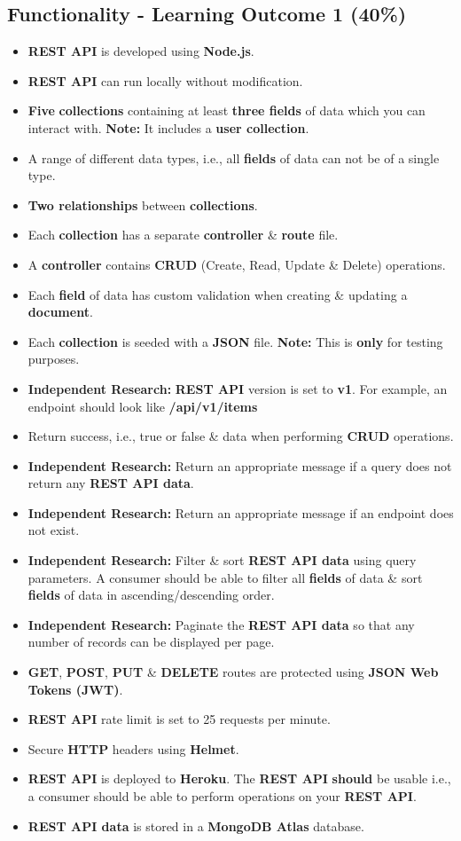 \documentclass{article}
\begin{document}
\subsection*{Functionality - Learning Outcome 1 (40\%)}
\begin{itemize}
	\item \textbf{REST API} is developed using \textbf{Node.js}.
	\item \textbf{REST API} can run locally without modification.
	\item \textbf{Five} \textbf{collections} containing at least \textbf{three fields} of data which you can interact with. \textbf{Note:} It includes a \textbf{user collection}.
	\item A range of different data types, i.e., all \textbf{fields} of data can not be of a single type.
	\item \textbf{Two relationships} between \textbf{collections}.
	\item Each \textbf{collection} has a separate \textbf{controller} \& \textbf{route} file.
	\item A \textbf{controller} contains \textbf{CRUD} (Create, Read, Update \& Delete) operations.
	\item Each \textbf{field} of data has custom validation when creating \& updating a \textbf{document}.
	\item Each \textbf{collection} is seeded with a \textbf{JSON} file. \textbf{Note:} This is \textbf{only} for testing purposes.
	\item \textbf{Independent Research:} \textbf{REST API} version is set to \textbf{v1}. For example, an endpoint should look like \textbf{/api/v1/items}
	\item Return success, i.e., true or false \& data when performing \textbf{CRUD} operations.
	\item \textbf{Independent Research:} Return an appropriate message if a query does not return any \textbf{REST API data}.
	\item \textbf{Independent Research:} Return an appropriate message if an endpoint does not exist.
	\item \textbf{Independent Research:} Filter \& sort \textbf{REST API data} using query parameters. A consumer should be able to filter all \textbf{fields} of data \& sort \textbf{fields} of data in ascending/descending order.
	\item \textbf{Independent Research:} Paginate the \textbf{REST API data} so that any number of records can be displayed per page.
	\item \textbf{GET}, \textbf{POST}, \textbf{PUT} \& \textbf{DELETE} routes are protected using \textbf{JSON Web Tokens (JWT)}.
	\item \textbf{REST API} rate limit is set to 25 requests per minute.
	\item Secure \textbf{HTTP} headers using \textbf{Helmet}. 
	\item \textbf{REST API} is deployed to \textbf{Heroku}. The \textbf{REST API} \textbf{should} be usable i.e., a consumer should be able to perform operations on your \textbf{REST API}.
	\item \textbf{REST API data} is stored in a \textbf{MongoDB Atlas} database.
\end{itemize}
\end{document}
